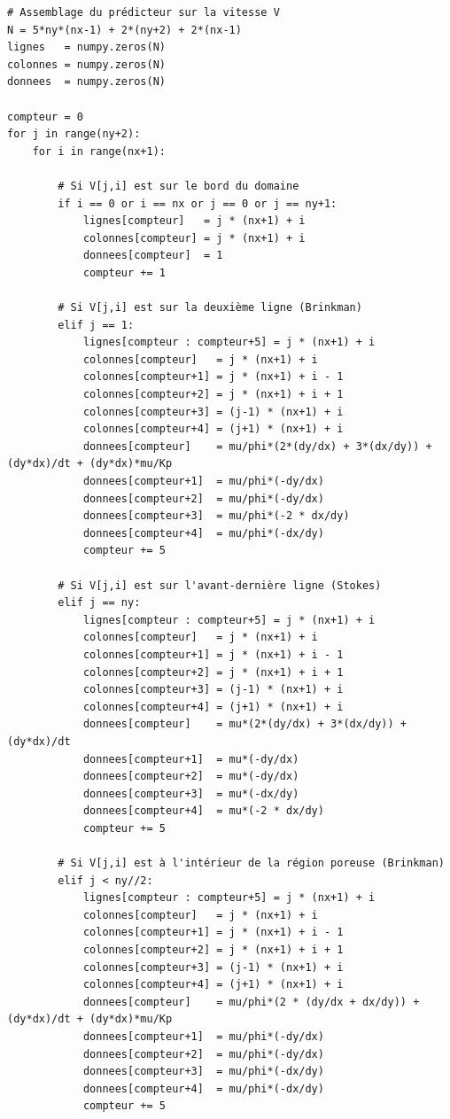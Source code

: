 \begin{verbatim}
# Assemblage du prédicteur sur la vitesse V
N = 5*ny*(nx-1) + 2*(ny+2) + 2*(nx-1)
lignes   = numpy.zeros(N)
colonnes = numpy.zeros(N)
donnees  = numpy.zeros(N)

compteur = 0
for j in range(ny+2):
    for i in range(nx+1):
        
        # Si V[j,i] est sur le bord du domaine
        if i == 0 or i == nx or j == 0 or j == ny+1:
            lignes[compteur]   = j * (nx+1) + i
            colonnes[compteur] = j * (nx+1) + i
            donnees[compteur]  = 1
            compteur += 1
                
        # Si V[j,i] est sur la deuxième ligne (Brinkman)
        elif j == 1:
            lignes[compteur : compteur+5] = j * (nx+1) + i
            colonnes[compteur]   = j * (nx+1) + i
            colonnes[compteur+1] = j * (nx+1) + i - 1
            colonnes[compteur+2] = j * (nx+1) + i + 1
            colonnes[compteur+3] = (j-1) * (nx+1) + i
            colonnes[compteur+4] = (j+1) * (nx+1) + i
            donnees[compteur]    = mu/phi*(2*(dy/dx) + 3*(dx/dy)) + (dy*dx)/dt + (dy*dx)*mu/Kp
            donnees[compteur+1]  = mu/phi*(-dy/dx)
            donnees[compteur+2]  = mu/phi*(-dy/dx)
            donnees[compteur+3]  = mu/phi*(-2 * dx/dy)
            donnees[compteur+4]  = mu/phi*(-dx/dy)
            compteur += 5
        
        # Si V[j,i] est sur l'avant-dernière ligne (Stokes)
        elif j == ny:
            lignes[compteur : compteur+5] = j * (nx+1) + i
            colonnes[compteur]   = j * (nx+1) + i
            colonnes[compteur+1] = j * (nx+1) + i - 1
            colonnes[compteur+2] = j * (nx+1) + i + 1
            colonnes[compteur+3] = (j-1) * (nx+1) + i
            colonnes[compteur+4] = (j+1) * (nx+1) + i
            donnees[compteur]    = mu*(2*(dy/dx) + 3*(dx/dy)) + (dy*dx)/dt
            donnees[compteur+1]  = mu*(-dy/dx)
            donnees[compteur+2]  = mu*(-dy/dx)
            donnees[compteur+3]  = mu*(-dx/dy)
            donnees[compteur+4]  = mu*(-2 * dx/dy)
            compteur += 5
        
        # Si V[j,i] est à l'intérieur de la région poreuse (Brinkman)
        elif j < ny//2:
            lignes[compteur : compteur+5] = j * (nx+1) + i
            colonnes[compteur]   = j * (nx+1) + i
            colonnes[compteur+1] = j * (nx+1) + i - 1
            colonnes[compteur+2] = j * (nx+1) + i + 1
            colonnes[compteur+3] = (j-1) * (nx+1) + i
            colonnes[compteur+4] = (j+1) * (nx+1) + i
            donnees[compteur]    = mu/phi*(2 * (dy/dx + dx/dy)) + (dy*dx)/dt + (dy*dx)*mu/Kp
            donnees[compteur+1]  = mu/phi*(-dy/dx)
            donnees[compteur+2]  = mu/phi*(-dy/dx)
            donnees[compteur+3]  = mu/phi*(-dx/dy)
            donnees[compteur+4]  = mu/phi*(-dx/dy)
            compteur += 5
        

\end{verbatim}
